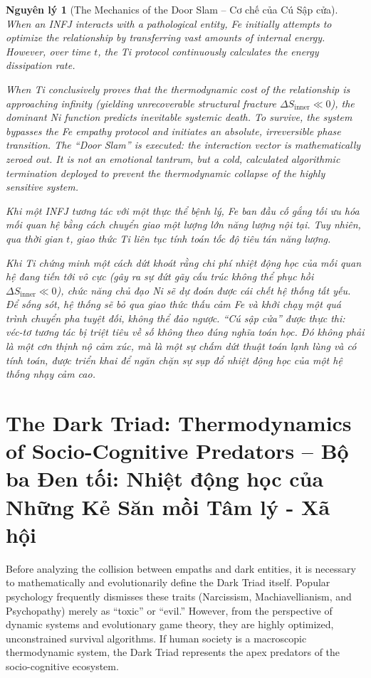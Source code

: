 \documentclass{report}
\newtheorem{nguyenly}{Nguyên lý}
\begin{document}
\begin{nguyenly}[The Mechanics of the Door Slam -- Cơ chế của Cú Sập cửa]
	When an INFJ interacts with a pathological entity, Fe initially attempts to optimize the relationship by transferring vast amounts of internal energy. However, over time $t$, the Ti protocol continuously calculates the energy dissipation rate. 
	
	When Ti conclusively proves that the thermodynamic cost of the relationship is approaching infinity (yielding unrecoverable structural fracture $\Delta S_{\text{inner}} \ll 0$), the dominant Ni function predicts inevitable systemic death. To survive, the system bypasses the Fe empathy protocol and initiates an absolute, irreversible phase transition. The ``Door Slam'' is executed: the interaction vector is mathematically zeroed out. It is not an emotional tantrum, but a cold, calculated algorithmic termination deployed to prevent the thermodynamic collapse of the highly sensitive system.
	
	Khi một INFJ tương tác với một thực thể bệnh lý, Fe ban đầu cố gắng tối ưu hóa mối quan hệ bằng cách chuyển giao một lượng lớn năng lượng nội tại. Tuy nhiên, qua thời gian $t$, giao thức Ti liên tục tính toán tốc độ tiêu tán năng lượng.
	
	Khi Ti chứng minh một cách dứt khoát rằng chi phí nhiệt động học của mối quan hệ đang tiến tới vô cực (gây ra sự đứt gãy cấu trúc không thể phục hồi $\Delta S_{\text{inner}} \ll 0$), chức năng chủ đạo Ni sẽ dự đoán được cái chết hệ thống tất yếu. Để sống sót, hệ thống sẽ bỏ qua giao thức thấu cảm Fe và khởi chạy một quá trình chuyển pha tuyệt đối, không thể đảo ngược. ``Cú sập cửa'' được thực thi: véc-tơ tương tác bị triệt tiêu về số không theo đúng nghĩa toán học. Đó không phải là một cơn thịnh nộ cảm xúc, mà là một sự chấm dứt thuật toán lạnh lùng và có tính toán, được triển khai để ngăn chặn sự sụp đổ nhiệt động học của một hệ thống nhạy cảm cao.
\end{nguyenly}


\chapter{The Dark Triad: Thermodynamics of Socio-Cognitive Predators -- Bộ ba Đen tối: Nhiệt động học của Những Kẻ Săn mồi Tâm lý - Xã hội}

Before analyzing the collision between empaths and dark entities, it is necessary to mathematically and evolutionarily define the Dark Triad itself. Popular psychology frequently dismisses these traits (Narcissism, Machiavellianism, and Psychopathy) merely as ``toxic'' or ``evil.'' However, from the perspective of dynamic systems and evolutionary game theory, they are highly optimized, unconstrained survival algorithms. If human society is a macroscopic thermodynamic system, the Dark Triad represents the apex predators of the socio-cognitive ecosystem.
\end{document}
